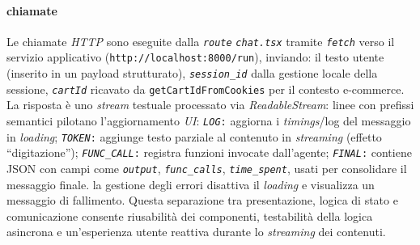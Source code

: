\paragraph{\textbf{chiamate}}
Le chiamate \emph{HTTP} sono eseguite dalla \texttt{\emph{route}} \texttt{\emph{chat.tsx}} tramite \texttt{\emph{fetch}} verso il servizio applicativo 
(\texttt{http://localhost:8000/run}), inviando:
il testo utente (inserito in un payload strutturato),
\texttt{\emph{session\_id}} dalla gestione locale della sessione,
\texttt{\emph{cartId}} ricavato da \texttt{getCartIdFromCookies} per il contesto e-commerce.
La risposta è uno \emph{stream} testuale processato via \emph{ReadableStream}:
linee con prefissi semantici pilotano l’aggiornamento \emph{UI}:
\texttt{\emph{LOG}:} aggiorna i \emph{timings}/log del messaggio in \emph{loading};
\texttt{\emph{TOKEN}:} aggiunge testo parziale al contenuto in \emph{streaming} (effetto “digitazione”);
\texttt{\emph{FUNC\_CALL}:} registra funzioni invocate dall’agente;
\texttt{\emph{FINAL}:} contiene JSON con campi come \texttt{\emph{output}}, \texttt{\emph{func\_calls}}, \texttt{\emph{time\_spent}}, usati per consolidare il messaggio finale.
la gestione degli errori disattiva il \emph{loading} e visualizza un messaggio di fallimento.
Questa separazione tra presentazione, logica di stato e comunicazione consente riusabilità dei componenti, testabilità della logica asincrona e 
un’esperienza utente reattiva durante lo \emph{streaming} dei contenuti.